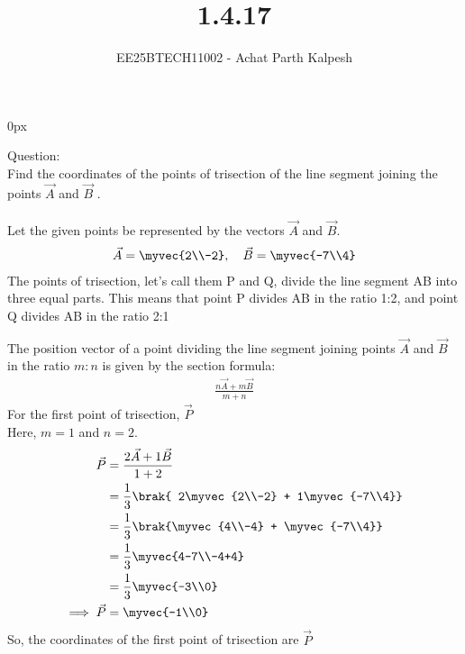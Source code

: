 \documentclass[journal]{IEEEtran}
\begin{document}

\title{1.4.17}
\author{EE25BTECH11002 - Achat Parth Kalpesh }
{\let\newpage\relax\maketitle}
\renewcommand{\thefigure}{\theenumi}
\renewcommand{\thetable}{\theenumi}
\setlength{\intextsep}{10pt} %
\renewcommand{\thetable}{\theenumi}
\parindent 0px



Question:\\
Find the coordinates of the points of trisection  of the line segment joining the points $\vec{A}$  and $\vec{B}$ .\\
\solution\\
Let the given points be represented by the vectors $\vec{A}$ and $\vec{B}$.
\begin{align*}
    \vec{A} = \myvec{2\\-2}, \quad \vec{B} = \myvec{-7\\4}
\end{align*}
The points of trisection, let's call them P and Q, divide the line segment AB into three equal parts.
This means that point P divides AB in the ratio 1:2, and point Q divides AB in the ratio 2:1

The position vector of a point dividing the line segment joining points $\vec{A}$ and $\vec{B}$ in the ratio $m:n$ is given by the section formula:
\begin{align*}
\frac{n \vec{A} + m \vec{B} }{m+n}
\end{align*}
For the first point of trisection, $\vec{P}$  \\
Here, $m=1$ and $n=2$.
\begin{align*}
    \vec{P} &= \frac{2 \vec{A} + 1 \vec{B}}{1+2} \\
      &= \frac{1}{3} \brak{ 2\myvec{2\\-2} + 1\myvec{-7\\4}} \\
      &= \frac{1}{3} \brak{\myvec{4\\-4} + \myvec{-7\\4}} \\
      &= \frac{1}{3} \myvec{4-7\\-4+4} \\
      &= \frac{1}{3} \myvec{-3\\0} \\
    \implies \vec{P} &= \myvec{-1\\0}
\end{align*}
So, the coordinates of the first point of trisection are $\vec{P}$ 
\end{document}
